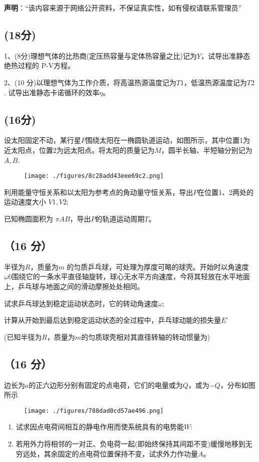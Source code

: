 
\textbf{声明}：“该内容来源于网络公开资料，不保证真实性，如有侵权请联系管理员”

\subsection{(18分)}
1、(8分)理想气体的比热商(定压热容量与定体热容量之比)记为$Y$，试导出准静态绝热过程的 P-V方程。

2、(10 分)以理想气体为工作介质，将高温热源温度记为$T1$，低温热源温度记为$T2$.
试导出准静态卡诺循环的效率$\eta$。
\subsection{(16分)}
设太阳固定不动，某行星$P$围绕太阳在一椭圆轨道运动，如图所示，其中位置1为近太阳点，位置2为远太阳点。将太阳的质量记为$M$，圆半长轴、半短轴分别记为$A,B$.
\begin{figure}[ht]
\centering
\texttt{[image: ./figures/8c28add43eee69c2.png]}
\caption{} \label{fig_PKU200_1}
\end{figure}
利用能量守恒关系和以太阳为参考点的角动量守恒关系，导出$P$在位置1、2两处的运动速度大小 $V1,V2$;

已知椭圆面积为 $\pi AB$，导出$P$的轨道运动周期$T$。
\subsection{（16 分）}
半径为$R$，质量为$m$ 的匀质乒乓球，可处理为厚度可略的球壳。开始时以角速度$\omega0$围绕它的一条水平直径轴旋转，球心无水平方向速度，今将其轻放在水平地面上，乒乓球与地面之间的滑动摩擦处处相同。

试求乒乓球达到稳定运动状态时，它的转动角速度$\omega$;

计算从开始到最后达到稳定运动状态的全过程中，乒乓球动能的损失量$E$'

(已知半径为$R$，质量为$m$的匀质球壳相对其直径转轴的转动惯量为)
\subsection{（16 分）}
边长为$a$的正六边形分别有固定的点电荷，它们的电量或为$Q$，或为$-Q$，分布如图所示
\begin{figure}[ht]
\centering
\texttt{[image: ./figures/788dad0cd57ae496.png]}
\caption{} \label{fig_PKU200_2}
\end{figure}
\begin{enumerate}
\item 试求因点电荷间相互的静电作用而使系统具有的电势能$W$:
\item 若用外力将相邻的一对正、负电荷一起(即始终保持其间距不变)缓慢地移到无穷远处，其余固定的点电荷位置保持不变，试求外力作功量$A$。
\end{enumerate}
